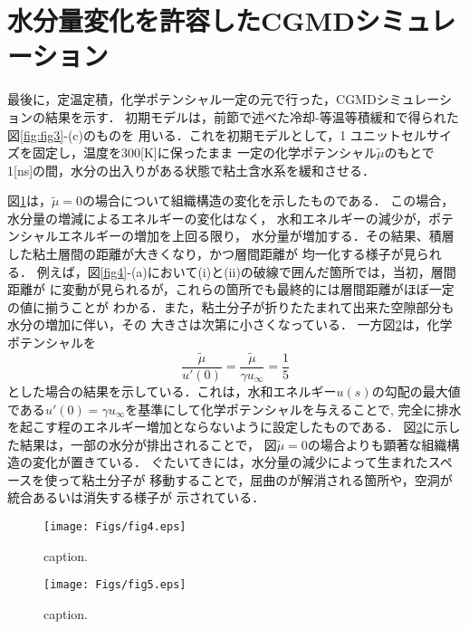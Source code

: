 \section{水分量変化を許容したCGMDシミュレーション}
最後に，定温定積，化学ポテンシャル一定の元で行った，CGMDシミュレーションの結果を示す．
初期モデルは，前節で述べた冷却-等温等積緩和で得られた図\ref{fig:fig3}-(c)のものを
用いる．これを初期モデルとして，1
ユニットセルサイズを固定し，温度を300[K]に保ったまま
一定の化学ポテンシャル$\tilde \mu$のもとで
1[ns]の間，水分の出入りがある状態で粘土含水系を緩和させる．

図\ref{fig:fig4}は，$\tilde \mu=0$の場合について組織構造の変化を示したものである．
この場合，水分量の増減によるエネルギーの変化はなく，
水和エネルギーの減少が，ポテンシャルエネルギーの増加を上回る限り，
水分量が増加する．その結果、積層した粘土層間の距離が大きくなり，かつ層間距離が
均一化する様子が見られる．
例えば，図\ref{fig4}-(a)において(i)と(ii)の破線で囲んだ箇所では，当初，層間距離が
に変動が見られるが，これらの箇所でも最終的には層間距離がほぼ一定の値に揃うことが
わかる．また，粘土分子が折りたたまれて出来た空隙部分も水分の増加に伴い，その
大きさは次第に小さくなっている．
%
一方図\ref{fig:fig5}は，化学ポテンシャルを
\begin{equation}
	\frac{\tilde \mu}{u'(0)}=
	\frac{\tilde \mu}{\gamma u_\infty}=\frac{1}{5}
	\label{eqn:mu02}
\end{equation}
とした場合の結果を示している．これは，水和エネルギー$u(s)$の勾配の最大値
である$u'(0)=\gamma u_{\infty}$を基準にして化学ポテンシャルを与えることで, 
完全に排水を起こす程のエネルギー増加とならないように設定したものである．
図\ref{fig:fig5}に示した結果は，一部の水分が排出されることで，
図$\tilde \mu=0$の場合よりも顕著な組織構造の変化が置きている．
ぐたいてきには，水分量の減少によって生まれたスペースを使って粘土分子が
移動することで，屈曲のが解消される箇所や，空洞が統合あるいは消失する様子が
示されている．
\begin{figure}[h]
	\begin{center}
	\texttt{[image: Figs/fig4.eps]} 
	\end{center}
	\caption{
		caption.
	} 
	\label{fig:fig4}
\end{figure}
\begin{figure}[h]
	\begin{center}
	\texttt{[image: Figs/fig5.eps]} 
	\end{center}
	\caption{
		caption.
	} 
	\label{fig:fig5}
\end{figure}
